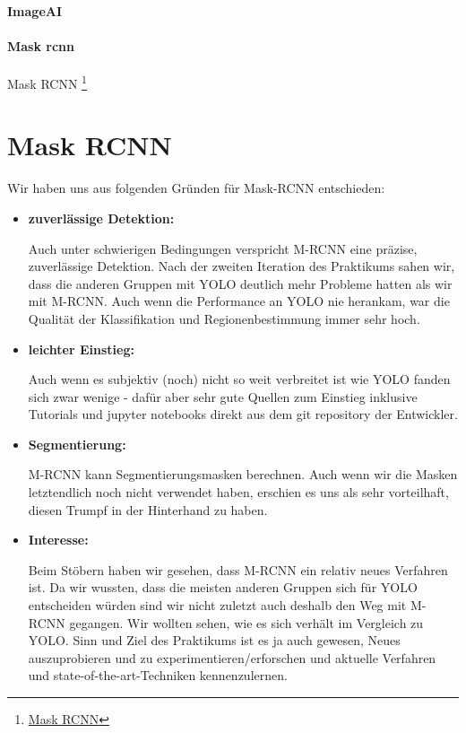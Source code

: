 \paragraph{ImageAI}
\paragraph{Mask rcnn}
Mask RCNN \footnote{\href{https://github.com/matterport/Mask_RCNN}{Mask RCNN}}

\section{Mask RCNN}
Wir haben uns aus folgenden Gründen für Mask-RCNN entschieden:
\begin{itemize}
	\item \textbf{zuverlässige Detektion:}

		Auch unter schwierigen Bedingungen verspricht M-RCNN eine präzise, zuverlässige Detektion.
		Nach der zweiten Iteration des Praktikums sahen wir, dass die anderen Gruppen mit YOLO deutlich mehr Probleme hatten als wir mit M-RCNN. Auch wenn die Performance an YOLO nie herankam, war die Qualität der Klassifikation und Regionenbestimmung immer sehr hoch.
	\item \textbf{leichter Einstieg:}

		Auch wenn es subjektiv (noch) nicht so weit verbreitet ist wie YOLO fanden sich zwar wenige - dafür aber sehr gute Quellen zum Einstieg inklusive Tutorials und jupyter notebooks direkt aus dem git repository der Entwickler.
	\item \textbf{Segmentierung:}

		M-RCNN kann Segmentierungsmasken berechnen.
		Auch wenn wir die Masken letztendlich noch nicht verwendet haben, erschien es uns als sehr vorteilhaft, diesen Trumpf in der Hinterhand zu haben.
	\item \textbf{Interesse:}

		Beim Stöbern haben wir gesehen, dass M-RCNN ein relativ neues Verfahren ist.
		Da wir wussten, dass die meisten anderen Gruppen sich für YOLO entscheiden würden sind wir nicht zuletzt auch deshalb den Weg mit M-RCNN gegangen.
		Wir wollten sehen, wie es sich verhält im Vergleich zu YOLO. Sinn und Ziel des Praktikums ist es ja auch gewesen, Neues auszuprobieren und zu experimentieren/erforschen und aktuelle Verfahren und state-of-the-art-Techniken kennenzulernen.

\end{itemize}
